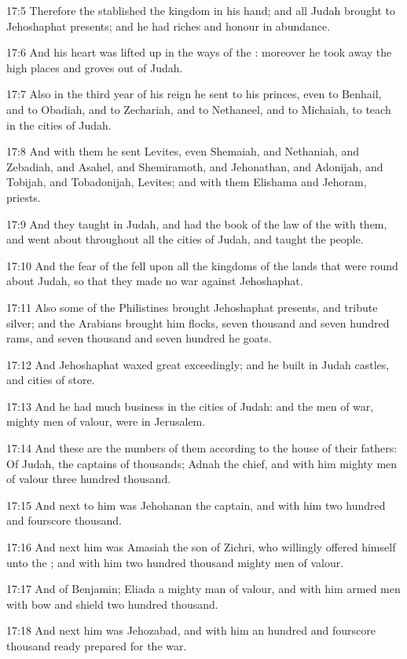 17:5 Therefore the \LORD stablished the kingdom in his hand; and all
Judah brought to Jehoshaphat presents; and he had riches and honour in
abundance.

17:6 And his heart was lifted up in the ways of the \LORD: moreover he
took away the high places and groves out of Judah.

17:7 Also in the third year of his reign he sent to his princes, even
to Benhail, and to Obadiah, and to Zechariah, and to Nethaneel, and to
Michaiah, to teach in the cities of Judah.

17:8 And with them he sent Levites, even Shemaiah, and Nethaniah, and
Zebadiah, and Asahel, and Shemiramoth, and Jehonathan, and Adonijah,
and Tobijah, and Tobadonijah, Levites; and with them Elishama and
Jehoram, priests.

17:9 And they taught in Judah, and had the book of the law of the \LORD
with them, and went about throughout all the cities of Judah, and
taught the people.

17:10 And the fear of the \LORD fell upon all the kingdoms of the lands
that were round about Judah, so that they made no war against
Jehoshaphat.

17:11 Also some of the Philistines brought Jehoshaphat presents, and
tribute silver; and the Arabians brought him flocks, seven thousand
and seven hundred rams, and seven thousand and seven hundred he goats.

17:12 And Jehoshaphat waxed great exceedingly; and he built in Judah
castles, and cities of store.

17:13 And he had much business in the cities of Judah: and the men of
war, mighty men of valour, were in Jerusalem.

17:14 And these are the numbers of them according to the house of
their fathers: Of Judah, the captains of thousands; Adnah the chief,
and with him mighty men of valour three hundred thousand.

17:15 And next to him was Jehohanan the captain, and with him two
hundred and fourscore thousand.

17:16 And next him was Amasiah the son of Zichri, who willingly
offered himself unto the \LORD; and with him two hundred thousand
mighty men of valour.

17:17 And of Benjamin; Eliada a mighty man of valour, and with him
armed men with bow and shield two hundred thousand.

17:18 And next him was Jehozabad, and with him an hundred and
fourscore thousand ready prepared for the war.

